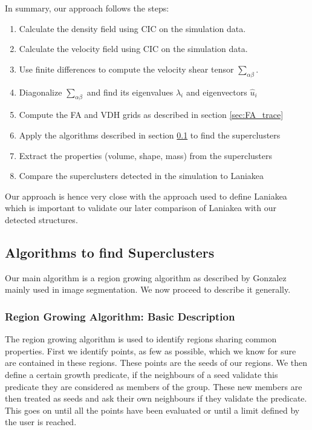 \documentclass[12pt]{article}
\begin{document}
\begin{par}
In summary, our approach follows the steps:
\end{par}

\begin{enumerate}
\item Calculate the density field using CIC on the simulation data.
\item Calculate the velocity field using CIC on the simulation data.
\item Use finite differences to compute the velocity shear tensor $\sum_{\alpha \beta}$.
\item Diagonalize $\sum_{\alpha \beta}$ and find its eigenvalues $\lambda_i$ and eigenvectors $\hat{u}_i$
\item Compute the FA and VDH grids as described in section \ref{sec:FA_trace} 
\item Apply the algorithms described in section \ref{sec:algorithms} to find the superclusters
\item Extract the properties (volume, shape, mass) from the superclusters
\item Compare the superclusters detected in the simulation to Laniakea
\end{enumerate}




\begin{par}
Our approach is hence very close with the approach
 used to define Laniakea
  \cite{tully_laniakea_2014} which is important to
   validate our later comparison of Laniakea with
    our detected structures.
\end{par}

\subsection{Algorithms to find Superclusters}\label{sec:algorithms}

Our main algorithm is a region growing algorithm
 as described by Gonzalez
  \cite{gonzalez_digital_2008} mainly used in
   image segmentation. We now proceed to describe
    it generally.
\subsubsection{Region Growing Algorithm: Basic Description}

\begin{par}
The region growing algorithm is used to identify regions sharing common properties. First we identify points, as few as possible, which we know for sure are contained in these regions. These points are the seeds of our regions. We then define a certain growth predicate, if the neighbours of a seed validate this predicate they are considered as members of the group. These new members are then treated as seeds and ask their own neighbours if they validate the predicate. This goes on until all the points have been evaluated or until a limit defined by the user is reached.
\end{par}
\end{document}
